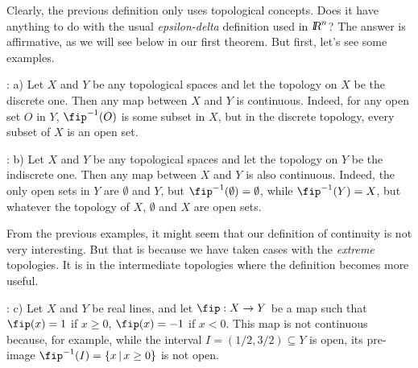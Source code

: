 
\espa

Clearly, the previous definition only uses topological concepts. Does it have anything to do with the usual {\sl epsilon-delta} definition used in $\mbox{\sl {l$\!\!\!\;\:\!$R}}^n$? The answer is affirmative, as we will see below in our first theorem. But first, let's see some examples.

\ejem: a) Let $X$ and $Y$ be any topological spaces and let the topology on $X$ be the discrete one. Then any map between $X$ and $Y$ is continuous. Indeed, for any open set $O$ in $Y$, $\fip^{-1}(O)$ is some subset in $X$, but in the discrete topology, every subset of $X$ is an open set.

\ejem: b) Let $X$ and $Y$ be any topological spaces and let the topology on $Y$ be the indiscrete one. Then any map between $X$ and $Y$ is also continuous. Indeed, the only open sets in $Y$ are $\emptyset$ and $Y$, but $\fip^{-1}(\emptyset) = \emptyset$, while $\fip^{-1}(Y)=X$, but whatever the topology of $X$, $\emptyset$ and $X$ are open sets.

From the previous examples, it might seem that our definition of continuity is not very interesting. But that is because we have taken cases with the {\sl extreme} topologies. It is in the intermediate topologies where the definition becomes more useful.

\ejem: c) Let $X$ and $Y$ be real lines, and let $\fip : X \to Y$ be a map such that $\fip(x) = 1$ if $x \geq 0$, $\fip(x) = -1$ if $x < 0$. This map is not continuous because, for example, while the interval $I = (1/2, 3/2) \subseteq Y$ is open, its pre-image $\fip^{-1}(I) = \{x \, | \, x \geq 0 \}$ is not open.

